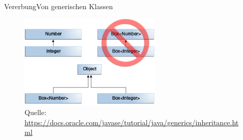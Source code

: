 \begin{frame}{Vererbung}{Von generischen Klassen}
    \begin{figure}
        \centering
        \includegraphics[height=4.5cm]{graph/generics-subtypeRelationship.png}
        \caption*{Quelle: \url{https://docs.oracle.com/javase/tutorial/java/generics/inheritance.html}}
    \end{figure}
\end{frame}
